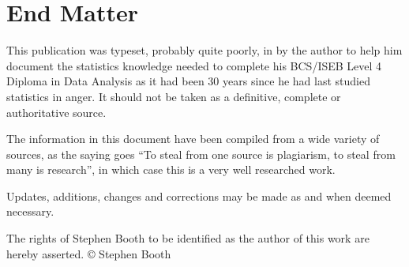 \chapter{End Matter} \label{End Matter}

This publication was typeset, probably quite poorly, in \LaTeXe by the author to help him document the statistics knowledge needed to complete his BCS/ISEB Level 4 Diploma in Data Analysis as it had been 30 years since he had last studied statistics in anger.  It should not be taken as a definitive, complete or authoritative source.

The information in this document have been compiled from a wide variety of sources, as the saying goes ``To steal from one source is plagiarism, to steal from many is research'', in which case this is a very well researched work.  

Updates, additions, changes and corrections may be made as and when deemed necessary.

The rights of Stephen Booth to be identified as the author of this work are hereby asserted. \copyright {\the\year}  Stephen Booth